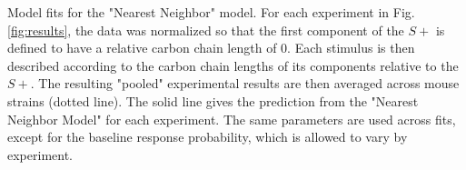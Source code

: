 \label{fig:model_fits}
Model fits for the "Nearest Neighbor" model.  For each experiment in Fig. \ref{fig:results}, the data was normalized so that the first component of the $S+$ is defined to have a relative carbon chain length of 0.  Each stimulus is then described according to the carbon chain lengths of its components relative to the $S+$.  The resulting "pooled" experimental results are then averaged across mouse strains (dotted line). The solid line gives the prediction from the "Nearest Neighbor Model" for each experiment.  The same parameters are used across fits, except for the baseline response probability, which is allowed to vary by experiment.   